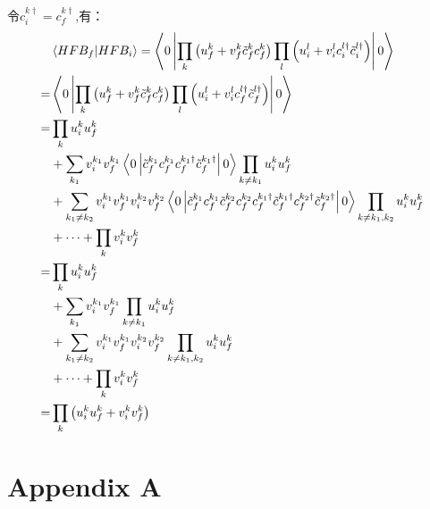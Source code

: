 \documentclass[master]{shnuthesis}
\begin{document}
令$c_i^{k\dagger}=c_f^{k\dagger}$,有：
\begin{align}
    & \left\langle HFB_f|HFB_i \right\rangle = \left\langle 0\left|\prod_{k}\left(u_f^k+v_f^k \tilde{c}_f^k c_f^k\right) \prod_{l}\left(u_i^l+v_i^l c_i^{l\dagger} \tilde{c}_i^{l\dagger}\right)\right|0 \right\rangle \notag\\
    =& \left\langle 0\left|\prod_{k}\left(u_f^k+v_f^k \tilde{c}_f^k c_f^k\right) \prod_{l}\left(u_i^l+v_i^l c_f^{l\dagger} \tilde{c}_f^{l\dagger}\right)\right|0 \right\rangle  \notag\\
    =& \prod_{k} u_i^k u_f^k \notag\\
    &+ \sum_{k_1} v_i^{k_1} v_f^{k_1} \left\langle 0\left| \tilde{c}_f^{k_1} c_f^{k_1} c_f^{k_1\dagger} \tilde{c}_f^{k_1\dagger}\right|0 \right\rangle \prod_{k\neq k_1} u_i^k u_f^k \notag\\
    &+ \sum_{k_1\neq k_2} v_i^{k_1} v_f^{k_1} v_i^{k_2} v_f^{k_2} \left\langle 0\left| \tilde{c}_f^{k_1} c_f^{k_1} \tilde{c}_f^{k_2} c_f^{k_2} c_f^{k_1\dagger} \tilde{c}_f^{k_1\dagger}c_f^{k_2\dagger} \tilde{c}_f^{k_2\dagger}\right|0 \right\rangle \prod_{k\neq k_1,k_2} u_i^k u_f^k \notag\\
    &+ \cdots + \prod_{k} v_i^k v_f^k \notag\\
    =& \prod_{k} u_i^k u_f^k \notag\\
    &+ \sum_{k_1} v_i^{k_1} v_f^{k_1} \prod_{k\neq k_1} u_i^k u_f^k \notag\\
    &+ \sum_{k_1\neq k_2} v_i^{k_1} v_f^{k_1} v_i^{k_2} v_f^{k_2} \prod_{k\neq k_1,k_2} u_i^k u_f^k \notag\\
    &+ \cdots + \prod_{k} v_i^k v_f^k \notag\\
    =& \prod_k \left(u_i^k u_f^k + v_i^k v_f^k\right)
\end{align}




\backmatter  %
\appendix
\setcounter{equation}{0}
\chapter{Appendix A}
\renewcommand{\thesection}{A.\arabic{section}} %
\renewcommand{\theequation}{A-\arabic{equation}} %
\renewcommand{\thefigure}{A.\arabic{figure}} %
\setcounter{table}{0}
\renewcommand{\thetable}{A.\arabic{table}} %
\end{document}
